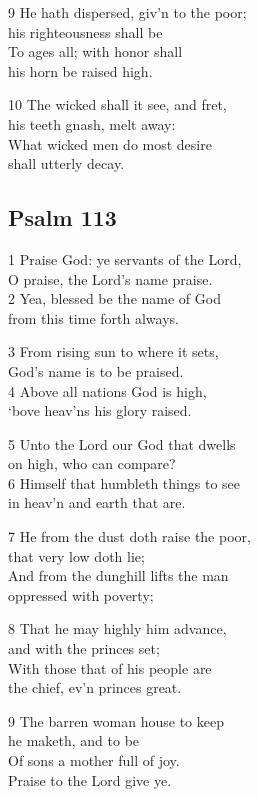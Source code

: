 9 He hath dispersed, giv’n to the poor;\\
his righteousness shall be\\
To ages all; with honor shall\\
his horn be raised high.

10 The wicked shall it see, and fret,\\
his teeth gnash, melt away:\\
What wicked men do most desire\\
shall utterly decay.

\begin{center}
\quad{}\quad{}
\end{center}


\subsection*{Psalm 113}

1 Praise God: ye servants of the Lord,\\
O praise, the Lord’s name praise.\\
2 Yea, blessed be the name of God\\
from this time forth always.

3 From rising sun to where it sets,\\
God’s name is to be praised.\\
4 Above all nations God is high,\\
‘bove heav’ns his glory raised.

5 Unto the Lord our God that dwells\\
on high, who can compare?\\
6 Himself that humbleth things to see\\
in heav’n and earth that are.

7 He from the dust doth raise the poor,\\
that very low doth lie;\\
And from the dunghill lifts the man\\
oppressed with poverty;

8 That he may highly him advance,\\
and with the princes set;\\
With those that of his people are\\
the chief, ev’n princes great.

9 The barren woman house to keep\\
he maketh, and to be\\
Of sons a mother full of joy.\\
Praise to the Lord give ye.

